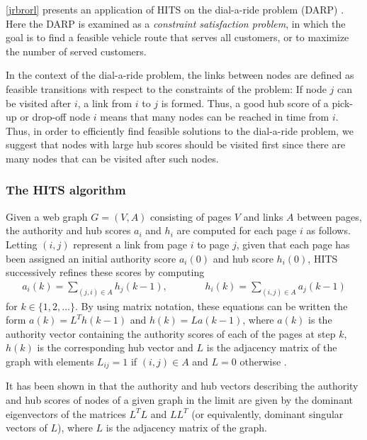\documentclass[dissertation,draft*]{aaltoseries}
\begin{document}
\ref{jrbrorl} presents an application of HITS on the dial-a-ride problem (DARP)
\cite{berbegliathesis,berbegliahybrid,berbegliafeas}.
Here the DARP is examined as a \emph{constraint satisfaction problem}, in which the goal
is to find a feasible vehicle route that serves all customers, or to maximize the number of served customers.



In the context of the dial-a-ride problem, 
the links between nodes are defined as feasible transitions with respect to the %
constraints of the problem: If node $j$ can be visited after $i$, a link from $i$ to $j$ 
is formed. Thus, a good hub score of a pick-up or drop-off node $i$ means 
that many nodes can be reached in time from $i$. 
Thus, in order to efficiently find feasible solutions to the dial-a-ride problem, we suggest that nodes with large 
hub scores should be visited first since there are many nodes that can
be visited after such nodes. 


\subsubsection{The HITS algorithm \cite{kleinberg}}
\label{hits}
Given a web graph $G = (V,A)$ consisting of pages $V$ and links $A$ between pages,
the authority and hub scores $a_i$ and $h_i$ are computed for each page $i$ as follows.
Letting 
$(i,j)$ represent a link from page $i$ to page $j$, given that each page has been 
assigned an initial authority score $a_i(0)$ and hub score $h_i(0)$, HITS successively
refines these scores by computing
\begin{align*}
a_i(k)  = \sum_{(j,i) \in A} h_j(k-1), \ \ \ \ \ \ \ \ \ \ \  \ \ \ \ \ \ 
h_i(k)  = \sum_{(i,j) \in A} a_j(k-1)
\end{align*}
for $k \in \{1,2,\ldots\}$. By using matrix notation, these equations can be written the form 
$a(k) = L^T h(k-1)$ and $h(k) = L a(k-1)$,
where $a(k)$ is the authority vector containing the authority scores of
each of the pages at step $k$, $h(k)$ is the corresponding hub vector and
$L$ is the adjacency matrix of the graph with elements $L_{ij} = 1$ if
$(i,j) \in A$ and $L=0$ otherwise \cite{langville}. 

It has been shown in \cite{farahat} that the authority and hub vectors
describing the authority and hub scores of nodes of a given graph in the limit are given by 
the dominant eigenvectors of the matrices $L^TL$ and $LL^T$ 
(or equivalently, dominant singular vectors of $L$), 
where $L$ is the adjacency matrix of the graph. 
\end{document}
